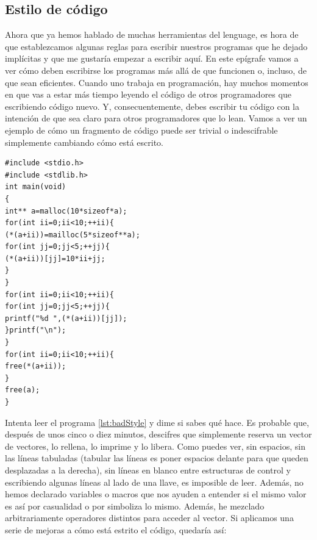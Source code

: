 \documentclass[a4paper]{article}
\begin{document}
\subsection{Estilo de código}
Ahora que ya hemos hablado de muchas herramientas del lenguage, es hora de que
establezcamos algunas reglas para escribir nuestros programas que he dejado
implícitas y que me gustaría empezar a escribir aquí. En este epígrafe vamos
a ver cómo deben escribirse los programas más allá de que funcionen o, incluso,
de que sean eficientes. Cuando uno trabaja en programación, hay muchos momentos
en que vas a estar más tiempo leyendo el código de otros programadores que
escribiendo código nuevo. Y, consecuentemente, debes escribir tu código con la
intención de que sea claro para otros programadores que lo lean. Vamos a ver
un ejemplo de cómo un fragmento de código puede ser trivial o indescifrable
simplemente cambiando cómo está escrito.

\noindent
\begin{minipage}[H]{\linewidth}
\mbox{}
\begin{lstlisting}[style=C,
caption={Ejemplo de programa escrito con un mal estilo},
label={lst:badStyle}]
#include <stdio.h>
#include <stdlib.h>
int main(void)
{
int** a=malloc(10*sizeof*a);
for(int ii=0;ii<10;++ii){
(*(a+ii))=mailloc(5*sizeof**a);
for(int jj=0;jj<5;++jj){
(*(a+ii))[jj]=10*ii+jj;
}
}
for(int ii=0;ii<10;++ii){
for(int jj=0;jj<5;++jj){
printf("%d ",(*(a+ii))[jj]);
}printf("\n");
}
for(int ii=0;ii<10;++ii){
free(*(a+ii));
}
free(a);
}
\end{lstlisting}
\end{minipage}

Intenta leer el programa \ref{lst:badStyle} y dime si sabes qué hace. Es probable
que, después de unos cinco o diez minutos, descifres que simplemente reserva un
vector de vectores, lo rellena, lo imprime y lo libera. Como puedes ver, sin
espacios, sin las líneas tabuladas (tabular las líneas es poner espacios delante
para que queden desplazadas a la derecha), sin líneas en blanco entre
estructuras de control y escribiendo algunas líneas al lado de una llave,
es imposible de
leer. Además, no hemos declarado variables o macros que nos ayuden a entender
si el mismo valor es así por casualidad o por simboliza lo mismo. Además, he
mezclado arbitrariamente operadores distintos para acceder al vector. Si
aplicamos una serie de mejoras a cómo está estrito el código, quedaría así:
\end{document}
